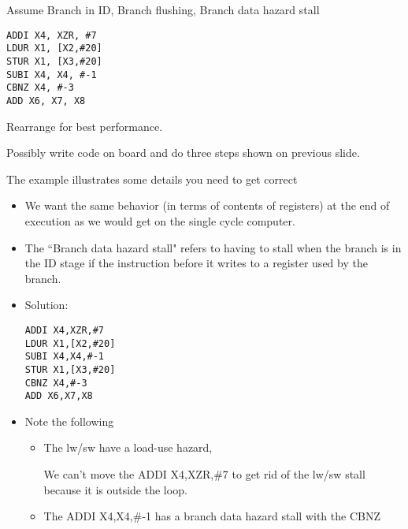 








\begin{frame}[fragile]
\begin{tcolorbox}[enhanced,attach boxed title to top center={yshift=-3mm,yshifttext=-1mm},
  colback=red!5!white,colframe=red!75!black,colbacktitle=red!80!black,
  title=Try this,fonttitle=\bfseries,
  boxed title style={size=small,colframe=red!50!black} ]  
  Assume Branch in ID, Branch flushing, Branch data hazard stall
\begin{verbatim}
ADDI X4, XZR, #7
LDUR X1, [X2,#20]
STUR X1, [X3,#20]
SUBI X4, X4, #-1
CBNZ X4, #-3
ADD X6, X7, X8
\end{verbatim}

Rearrange for best performance.
\end{tcolorbox}
\BNotes\ifnum{}
Possibly write code on board and do three steps shown on previous slide.

The example illustrates some details you need to get correct
\begin{itemize}
\item We want the same behavior (in terms
		of contents of registers) at the end of execution as we
		would get on the single cycle computer.
\item The ``Branch data hazard stall" refers to having to stall when the
	branch is in the ID stage if the instruction before it writes to a
	register used by the branch.
\item Solution:
\begin{verbatim}
ADDI X4,XZR,#7
LDUR X1,[X2,#20]
SUBI X4,X4,#-1
STUR X1,[X3,#20]
CBNZ X4,#-3
ADD X6,X7,X8
\end{verbatim}
\item Note the following
\begin{itemize}
\item The lw/sw have a load-use hazard, 

		We can't move the ADDI X4,XZR,\#7 to get rid of the lw/sw stall
		because it is outside the loop.
\item The ADDI X4,X4,\#-1 has a branch data hazard stall with the CBNZ
\end{itemize}
\end{itemize}
\fi\ENotes
\end{frame}

